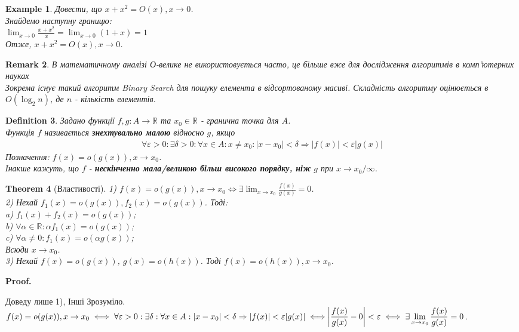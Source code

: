 \documentclass[a4paper, 14pt]{article}
\makeatletter
\def\huge{\displaystyle}
\def\qed{$\blacksquare$}
\theoremstyle{theoremdd}
\newtheorem{theorem}{Theorem}[subsection]
\theoremstyle{theoremdd}
\newtheorem{definition}[theorem]{Definition}
\theoremstyle{theoremdd}
\theoremstyle{theoremdd}
\newtheorem{example}[theorem]{Example}
\theoremstyle{theoremdd}
\theoremstyle{theoremdd}
\newtheorem{remark}[theorem]{Remark}
\theoremstyle{theoremdd}
\theoremstyle{theoremdd}
\renewenvironment{proof}[1][Proof.\\]{\par
\pushQED{\hfill \qed}%
\normalfont \topsep6\p@\@plus6\p@\relax
\trivlist
\item\relax
{\bfseries
#1\@addpunct{.}}\hspace\labelsep\ignorespaces
}{%
\popQED\endtrivlist\@endpefalse
}
\makeatother
\begin{document}
\begin{example}
Довести, що $x+x^2 = O(x), x \to 0$.\\
Знайдемо наступну границю:\\
$\huge \lim_{x \to 0} \frac{x+x^2}{x} = \lim_{x \to 0}(1+x) = 1$\\
Отже, $x+x^2 = O(x), x \to 0$.
\end{example}

\begin{remark}
В математичному аналізі О-велике не використовується часто, це більше вже для дослідження алгоритмів в комп'ютерних науках\\
Зокрема існує такий алгоритм Binary Search для пошуку елемента в відсортованому масиві. Складність алгоритму оцінюється в $O(\log_2 n)$, де $n$ - кількість елементів.
\end{remark}

\begin{definition}
Задано функції $f,g: A \to \mathbb{R}$ та $x_0 \in \mathbb{R}$ - гранична точка для $A$.\\
Функція $f$ називається \textbf{знехтувально малою} відносно $g$, якщо
\begin{align*}
\forall \varepsilon>0: \exists \delta > 0: \forall x \in A: x \neq x_0: |x-x_0| < \delta \Rightarrow |f(x)| < \varepsilon |g(x)|
\end{align*}
Позначення: $f(x) = o(g(x)), x \to x_0$.\\
Інакше кажуть, що $f$ - \textbf{нескінченно мала/великою більш високого порядку, ніж} $g$ при $x \to x_0/\infty$.
\end{definition}

\begin{theorem}[Властивості]
1) $f(x) = o(g(x)), x \to x_0 \iff \huge \exists \lim_{x \to x_0} \frac{f(x)}{g(x)} = 0$.
\bigskip \\
2) Нехай $f_1(x) = o(g(x)), f_2(x) = o(g(x))$. Тоді:\\
a) $f_1(x) + f_2(x) = o(g(x))$;\\
b) $\forall \alpha \in \mathbb{R}: \alpha f_1(x) = o(g(x))$;\\
c) $\forall \alpha \neq 0: f_1(x) = o(\alpha g(x))$;\\
Всюди $x \to x_0$.
\bigskip \\
3) Нехай $f(x) = o(g(x))$, $g(x) = o(h(x))$. Тоді $f(x) = o(h(x)), x \to x_0$.
\end{theorem}

\begin{proof}
Доведу лише 1), Інші Зрозуміло.\\
$f(x) = o(g(x)),x \to x_0 \iff \forall \varepsilon>0: \exists \delta: \forall x \in A: |x-x_0| < \delta \Rightarrow |f(x)| < \varepsilon |g(x)| \iff \\ \huge \abs{\frac{f(x)}{g(x)} - 0} < \varepsilon \iff \exists \lim_{x \to x_0} \frac{f(x)}{g(x)} = 0$.
\end{proof}
\end{document}
